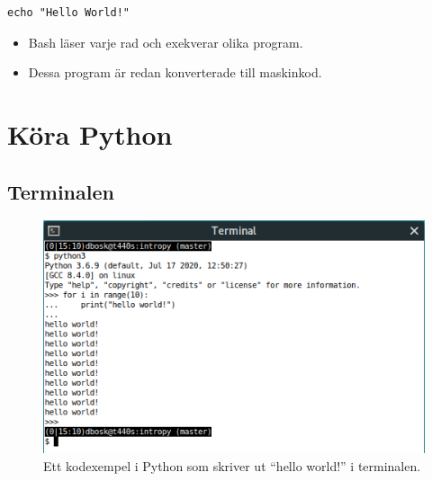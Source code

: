 \begin{frame}[fragile]
  \begin{example}[Terminalen]
    \begin{verbatim}
echo "Hello World!"
    \end{verbatim}
  \end{example}

  \pause

  \begin{remark}
    \begin{itemize}
      \item Bash läser varje rad och exekverar olika program.
      \item Dessa program är redan konverterade till maskinkod.
    \end{itemize}
  \end{remark}
\end{frame}


\section{Köra Python}

\subsection{Terminalen}

\begin{frame}
  \begin{figure}
    \centering
    \includegraphics[height=0.8\textheight]{figs/python-terminal.png}
    \caption{Ett kodexempel i Python som skriver ut \enquote{hello world!} i 
    terminalen.}
  \end{figure}
\end{frame}


